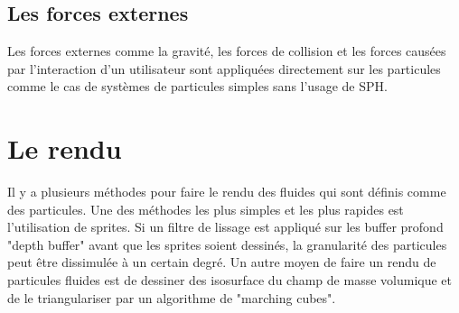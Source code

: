 \documentclass[11pt]{report}
\begin{document}
\subsection{Les forces externes}

Les forces externes comme la gravité, les forces de collision et les forces causées par l'interaction d'un utilisateur sont appliquées directement sur les particules comme le cas de systèmes de particules simples sans l'usage de SPH.

\section{Le rendu}

Il y a plusieurs méthodes pour faire le rendu des fluides qui sont définis comme des particules. Une des méthodes les plus simples et les plus rapides est l'utilisation de sprites. Si un filtre de lissage est appliqué sur les buffer profond "depth buffer" avant que les sprites soient dessinés, la granularité des particules peut être dissimulée à un certain degré. Un autre moyen de faire un rendu de particules fluides est de dessiner des isosurface du champ de masse volumique et de le triangulariser par un algorithme de "marching cubes". 
\end{document}
